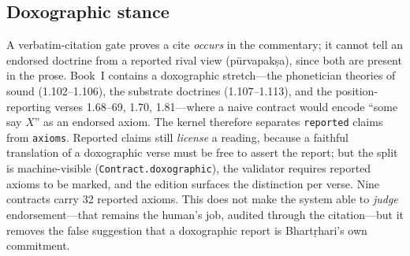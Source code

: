 \documentclass[11pt]{article}
\begin{document}
\subsection{Doxographic stance}
\label{sec:stance}
A verbatim-citation gate proves a cite \emph{occurs} in the commentary; it
cannot tell an endorsed doctrine from a reported rival view
(p\={u}rvapak\d{s}a), since both are present in the prose. Book~I contains a
doxographic stretch---the phonetician theories of sound (1.102--1.106), the
substrate doctrines (1.107--1.113), and the position-reporting verses
1.68--69, 1.70, 1.81---where a naive contract would encode ``some say $X$'' as
an endorsed axiom. The kernel therefore separates \texttt{reported} claims
from \texttt{axioms}. Reported claims still \emph{license} a reading, because a
faithful translation of a doxographic verse must be free to assert the report;
but the split is machine-visible (\texttt{Contract.doxographic}), the validator
requires reported axioms to be marked, and the edition surfaces the distinction
per verse. Nine contracts carry 32 reported axioms. This does not make the
system able to \emph{judge} endorsement---that remains the human's job, audited
through the citation---but it removes the false suggestion that a doxographic
report is Bhart\d{r}hari's own commitment.
\end{document}
